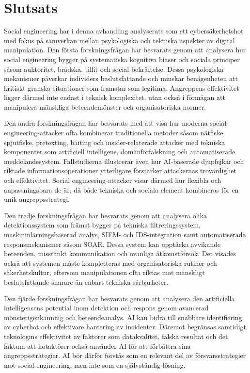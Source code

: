 \chapter{Slutsats}

Social engineering har i denna avhandling analyserats som ett cybersäkerhetshot med fokus på samverkan mellan psykologiska och tekniska aspekter av digital manipulation.
Den första forskningsfrågan har besvarats genom att analysera hur social engineering bygger på systematiska kognitiva biaser och sociala principer såsom auktoritet, brådska,
tillit och social bekräftelse. Dessa psykologiska mekanismer påverkar individers beslutsfattande och minskar benägenheten att kritiskt granska situationer som framstår som legitima.
Angreppens effektivitet ligger därmed inte endast i teknisk komplexitet, utan också i förmågan att manipulera mänskliga beteendemönster och organisatoriska normer.

Den andra forskningsfrågan har besvarats med att visa hur moderna social engineering-attacker ofta kombinerar traditionella metoder såsom nätfiske, spjutfiske, pretexting, baiting 
och insider-relaterade attacker med tekniska komponenter som artificiell intelligens, domänförfalskning och automatiserade meddelandesystem. Fallstudierna illustrerar även hur
AI-baserade djupfejkar och riktade informationsoperationer ytterligare förstärker attackernas trovärdighet och effektivitet. Social engineering-attacker visar därmed hur
flexibla och anpassningsbara de är, då både tekniska och sociala element kombineras för en unik angreppsstrategi.

Den tredje forskningsfrågan har besvarats genom att analysera olika detektionssystem som främst bygger på tekniska filtreringssystem, maskininlärningsbaserad analys, SIEM- och IDS-integration
samt automatiserade responsmekanismer såsom SOAR. Dessa system kan upptäcka avvikande beteenden, misstänkt kommunikation och ovanliga åtkomstförsök. Det visades också att systemen
måste kompletteras med organisatoriska rutiner och säkerhetskultur, eftersom manipulationen ofta riktas mot mänskligt beslutsfattande snarare än enbart tekniska sårbarheter.

Den fjärde forskningsfrågan har besvarats genom att analysera den artificiella intelligensens potential inom detektion och respons genom avancerad mönsterigenkänning och beteendeanalys.
AI kan bidra till snabbare identifiering av cyberhot och effektivare hantering av incidenter. Däremot begränsas samtidigt teknologins effektivitet av faktorer som datakvalitet, falska resultat och
det faktum att hotaktörer också använder AI för att förbättra sina angreppsstrategier. AI bör därför förstås som en relevant del av försvarsstrategier mot social engineering, men inte
som en självständig lösning.
